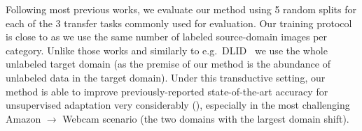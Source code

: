 Following most previous works, we evaluate our method using 5 random splits for each of the 3 transfer tasks commonly used for evaluation. Our training protocol is close to \cite{Tzeng14,Saenko10,Gong12} as we use the same number of labeled source-domain images per category. Unlike those works and similarly to e.g.\ DLID~\cite{Chopra13} we use the whole unlabeled target domain (as the premise of our method is the abundance of unlabeled data in the target domain). Under this transductive setting, our method is able to improve previously-reported state-of-the-art accuracy for unsupervised adaptation very considerably (), especially in the most challenging {\sc Amazon} $ \rightarrow $ {\sc Webcam} scenario (the two domains with the largest domain shift).
